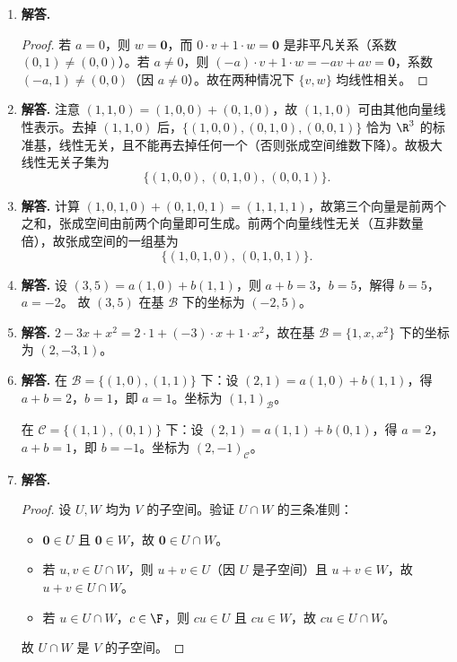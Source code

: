 \begin{enumerate}[label=\textbf{\arabic*.}, leftmargin=*, itemsep=1em]
\item \textbf{解答.}
\begin{proof}
若 $a=0$，则 $w=\mathbf{0}$，而 $0\cdot v+1\cdot w=\mathbf{0}$ 是非平凡关系（系数 $(0,1)\ne(0,0)$）。若 $a\ne 0$，则 $(-a)\cdot v+1\cdot w=-av+av=\mathbf{0}$，系数 $(-a,1)\ne(0,0)$（因 $a\ne 0$）。故在两种情况下 $\{v,w\}$ 均线性相关。
\end{proof}

\item \textbf{解答.}
注意 $(1,1,0)=(1,0,0)+(0,1,0)$，故 $(1,1,0)$ 可由其他向量线性表示。去掉 $(1,1,0)$ 后，$\{(1,0,0),(0,1,0),(0,0,1)\}$ 恰为 $\R^3$ 的标准基，线性无关，且不能再去掉任何一个（否则张成空间维数下降）。故极大线性无关子集为
\[
\{(1,0,0),\,(0,1,0),\,(0,0,1)\}.
\]

\item \textbf{解答.}
计算 $(1,0,1,0)+(0,1,0,1)=(1,1,1,1)$，故第三个向量是前两个之和，张成空间由前两个向量即可生成。前两个向量线性无关（互非数量倍），故张成空间的一组基为
\[
\{(1,0,1,0),\,(0,1,0,1)\}.
\]

\item \textbf{解答.}
设 $(3,5)=a(1,0)+b(1,1)$，则 $a+b=3$，$b=5$，解得 $b=5$，$a=-2$。
故 $(3,5)$ 在基 $\mathcal{B}$ 下的坐标为 $(-2,5)$。

\item \textbf{解答.}
$2-3x+x^2=2\cdot 1+(-3)\cdot x+1\cdot x^2$，故在基 $\mathcal{B}=\{1,x,x^2\}$ 下的坐标为 $(2,-3,1)$。

\item \textbf{解答.}
在 $\mathcal{B}=\{(1,0),(1,1)\}$ 下：设 $(2,1)=a(1,0)+b(1,1)$，得 $a+b=2$，$b=1$，即 $a=1$。坐标为 $(1,1)_{\mathcal{B}}$。

在 $\mathcal{C}=\{(1,1),(0,1)\}$ 下：设 $(2,1)=a(1,1)+b(0,1)$，得 $a=2$，$a+b=1$，即 $b=-1$。坐标为 $(2,-1)_{\mathcal{C}}$。

\item \textbf{解答.}
\begin{proof}
设 $U,W$ 均为 $V$ 的子空间。验证 $U\cap W$ 的三条准则：
\begin{itemize}
  \item $\mathbf{0}\in U$ 且 $\mathbf{0}\in W$，故 $\mathbf{0}\in U\cap W$。
  \item 若 $u,v\in U\cap W$，则 $u+v\in U$（因 $U$ 是子空间）且 $u+v\in W$，故 $u+v\in U\cap W$。
  \item 若 $u\in U\cap W$，$c\in\F$，则 $cu\in U$ 且 $cu\in W$，故 $cu\in U\cap W$。
\end{itemize}
故 $U\cap W$ 是 $V$ 的子空间。
\end{proof}


\end{enumerate}
